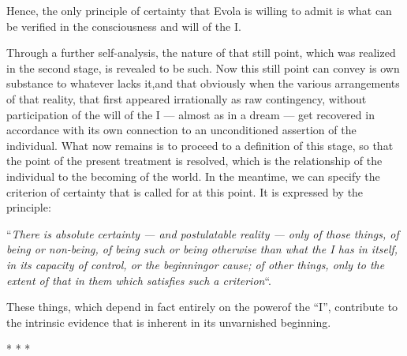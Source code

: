 Hence, the only principle of certainty that Evola is willing to admit is what can be verified in the consciousness and will of the I.

\begin{quotex}
Through a further self-analysis, the nature of that still point, which was realized in the second stage, is revealed to be such. Now this still point can convey is own substance to whatever lacks it,and that obviously when the various arrangements of that reality, that first appeared irrationally as raw contingency, without participation of the will of the I --- almost as in a dream --- get recovered in accordance with its own connection to an unconditioned assertion of the individual. What now remains is to proceed to a definition of this stage, so that the point of the present treatment is resolved, which is the relationship of the individual to the becoming of the world. In the meantime, we can specify the criterion of certainty that is called for at this point. It is expressed by the principle:

``\emph{There is absolute certainty --- and postulatable reality --- only of those things, of being or non-being, of being such or being otherwise than what the I has in itself, in its capacity of control, or the beginningor cause; of other things, only to the extent of that in them which satisfies such a criterion}``.

These things, which depend in fact entirely on the powerof the ``I'', contribute to the intrinsic evidence that is inherent in its unvarnished beginning.
\end{quotex}




\begin{center}* * *\end{center}

